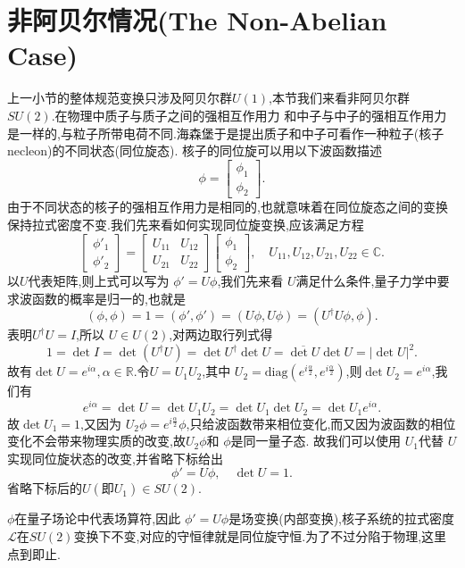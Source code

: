 \documentclass[../main.tex]{subfiles}
\begin{document}
\section{非阿贝尔情况(The Non-Abelian Case)}
  上一小节的整体规范变换只涉及阿贝尔群$U(1)$,本节我们来看非阿贝尔群 $SU(2)$.在物理中质子与质子之间的强相互作用力
  和中子与中子的强相互作用力是一样的,与粒子所带电荷不同.海森堡于是提出质子和中子可看作一种粒子(核子necleon)的不同状态(同位旋态).
  核子的同位旋可以用以下波函数描述\[
 \phi = \begin{bmatrix} \phi_1 \\ \phi_2 \end{bmatrix}  
  .\] 
  由于不同状态的核子的强相互作用力是相同的,也就意味着在同位旋态之间的变换保持拉式密度不变.我们先来看如何实现同位旋变换,应该满足方程\[
    \begin{bmatrix} \phi'_1\\\phi'_2  \end{bmatrix}  
    = \begin{bmatrix} U_{11}&U_{12}\\ U_{21}& U_{22} \end{bmatrix} 
    \begin{bmatrix} \phi_1 \\\phi_2 \end{bmatrix} 
    ,\quad U_{11},U_{12}, U_{21},U_{22} \in \mathbb{C} 
  .\] 
  以$U$代表矩阵,则上式可以写为 $\phi' = U \phi$,我们先来看 $U$满足什么条件,量子力学中要求波函数的概率是归一的,也就是 \[
    (\phi,\phi) = 1 = (\phi',\phi') = (U\phi,U\phi) = (U^\dagger U\phi,\phi) 
  .\] 
  表明$U^\dagger U = I$,所以 $U\in U(2)$,对两边取行列式得\[
    1 = \det{I}  = \det{(U^\dagger U)} = \det{U^\dagger} \det{U} = \overline{\det{U}}\det{U} =  |\det{U}|^2 
  .\] 
  故有$\det{U} = e^{i\alpha} , \alpha \in \mathbb{R}$.令$U = U_1U_2$,其中 $U_2 = \text{diag}(e^{i\frac{\alpha}{2}},e^{i \frac{\alpha}{2}})$,则$\det{U_2}=e^{i\alpha}$,我们有\[
    e^{i\alpha} = \det{U} = \det{U_1 U_2} = \det{U_1} \det{U_2} = \det{U_1}e^{i\alpha}  
  .\] 
  故$\det{U_1} = 1$,又因为 $U_2 \phi = e^{i \frac{\alpha}{2}} \phi$,只给波函数带来相位变化,而又因为波函数的相位变化不会带来物理实质的改变,故$U_2\phi$和 $\phi$是同一量子态.
  故我们可以使用 $U_1$代替 $U$实现同位旋状态的改变,并省略下标给出 \[
    \phi' = U\phi,\quad \det{U} = 1 
  .\] 
  省略下标后的$U(\text{即}U_1) \in SU(2)$.

$\phi$在量子场论中代表场算符,因此 $\phi' = U \phi$是场变换(内部变换),核子系统的拉式密度 $\mathscr{L}$在$SU(2)$变换下不变,对应的守恒律就是同位旋守恒.为了不过分陷于物理,这里点到即止.
\end{document}
